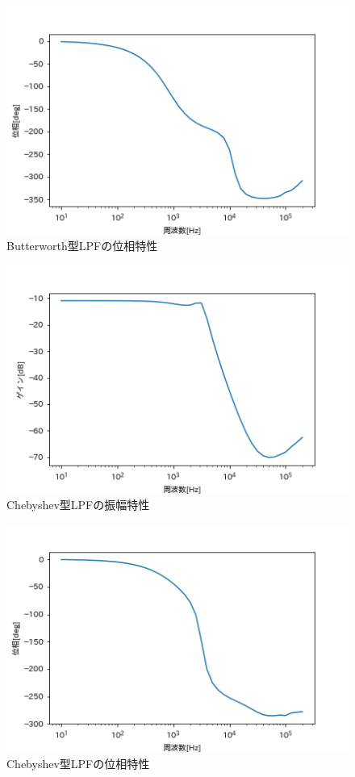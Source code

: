 \documentclass[dvipdfmx, twocolumn]{jsarticle}
\begin{document}
\begin{enumerate}
\begin{itemize}
\begin{figure}[H]
\begin{center}
\includegraphics[scale = 0.5]{BPLPF.png}
\caption{Butterworth型LPFの位相特性}
\end{center}
\end{figure}

\begin{figure}[H]
\begin{center}
\includegraphics[scale = 0.5]{CGLPF.png}
\caption{Chebyshev型LPFの振幅特性}
\end{center}
\end{figure}

\begin{figure}[H]
\begin{center}
\includegraphics[scale = 0.5]{CPLPF.png}
\caption{Chebyshev型LPFの位相特性}
\end{center}
\end{figure}


\end{itemize}
\end{enumerate}
\end{document}
